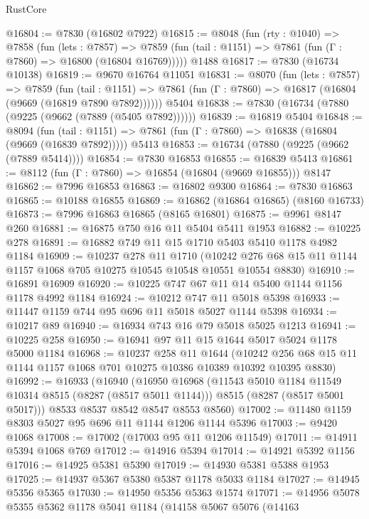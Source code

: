 \begin{lexlean}{RustCore}
\begin{coremodule}
@16804 := @7830 (@16802 @7922)
@16815 := @8048
    (fun (rty : @1040) =>
    @7858
      (fun (lets : @7857) =>
      @7859 (fun (tail : @1151) => @7861 (fun (Γ : @7860) => @16800 (@16804 @16769)))))
    @1488
@16817 := @7830 (@16734 @10138)
@16819 := @9670 @16764 @11051
@16831 := @8070
    (fun (lets : @7857) =>
    @7859
      (fun (tail : @1151) =>
      @7861 (fun (Γ : @7860) => @16817 (@16804 (@9669 (@16819 @7890 @7892))))))
    @5404
@16838 := @7830 (@16734 (@7880 (@9225 (@9662 (@7889 (@5405 @7892))))))
@16839 := @16819 @5404
@16848 := @8094
    (fun (tail : @1151) => @7861 (fun (Γ : @7860) => @16838 (@16804 (@9669 (@16839 @7892)))))
    @5413
@16853 := @16734 (@7880 (@9225 (@9662 (@7889 @5414))))
@16854 := @7830 @16853
@16855 := @16839 @5413
@16861 := @8112 (fun (Γ : @7860) => @16854 (@16804 (@9669 @16855))) @8147
@16862 := @7996 @16853
@16863 := @16802 @9300
@16864 := @7830 @16863
@16865 := @10188 @16855
@16869 := @16862 (@16864 @16865) (@8160 @16733)
@16873 := @7996 @16863 @16865 (@8165 @16801)
@16875 := @9961 @8147 @260
@16881 := @16875 @750 @16 @11 @5404 @5411 @1953
@16882 := @10225 @278
@16891 := @16882 @749 @11 @15 @1710 @5403 @5410 @1178 @4982 @1184
@16909 := @10237
    @278
    @11
    @1710
    (@10242 @276 @68 @15 @11 @1144 @1157 @1068 @705 @10275 @10545 @10548 @10551 @10554 @8830)
@16910 := @16891 @16909
@16920 := @10225 @747 @67 @11 @14 @5400 @1144 @1156 @1178 @4992 @1184
@16924 := @10212 @747 @11 @5018 @5398
@16933 := @11447 @1159 @744 @95 @696 @11 @5018 @5027 @1144 @5398
@16934 := @10217 @89
@16940 := @16934 @743 @16 @79 @5018 @5025 @1213
@16941 := @10225 @258
@16950 := @16941 @97 @11 @15 @1644 @5017 @5024 @1178 @5000 @1184
@16968 := @10237
    @258
    @11
    @1644
    (@10242 @256 @68 @15 @11 @1144 @1157 @1068 @701 @10275 @10386 @10389 @10392 @10395 @8830)
@16992 := @16933
    (@16940
      (@16950
        @16968
        (@11543 @5010 @1184 @11549 @10314 @8515 (@8287 (@8517 @5011 @1144)))
        @8515
        (@8287 (@8517 @5001 @5017)))
      @8533
      @8537
      @8542
      @8547
      @8553
      @8560)
@17002 := @11480 @1159 @8303 @5027 @95 @696 @11 @1144 @1206 @1144 @5396
@17003 := @9420 @1068
@17008 := @17002 (@17003 @95 @11 @1206 @11549)
@17011 := @14911 @5394 @1068 @769
@17012 := @14916 @5394
@17014 := @14921 @5392 @1156
@17016 := @14925 @5381 @5390
@17019 := @14930 @5381 @5388 @1953
@17025 := @14937 @5367 @5380 @5387 @1178 @5033 @1184
@17027 := @14945 @5356 @5365
@17030 := @14950 @5356 @5363 @1574
@17071 := @14956
    @5078
    @5355
    @5362
    @1178
    @5041
    @1184
    (@14158
      @5067
      @5076
      (@14163

\end{coremodule}
\end{lexlean}
